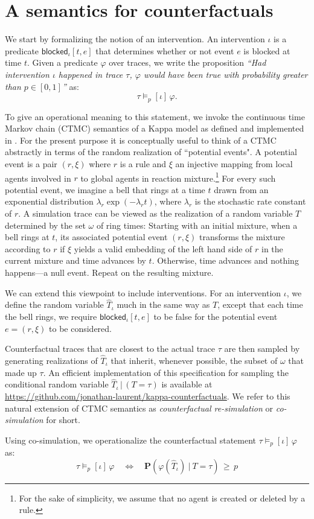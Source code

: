
\section{A semantics for counterfactuals}

We start by formalizing the notion of an intervention. An intervention $\iota$ is a predicate $\textsf{blocked}_{\iota}[t, e]$ that determines whether or not event $e$ is blocked at time $t$. Given a predicate $\varphi$ over traces, we write the proposition \textit{``Had intervention $\iota$ happened in trace $\tau$, $\varphi$ would have been true with probability greater than $p \in [0,1]$''} as:
\[ \tau \models_p [\iota] \, \varphi. \]

To give an operational meaning to this statement, we invoke the continuous time Markov chain (CTMC) semantics of a Kappa model as defined and implemented in \cite{DanosEtAl-APLAS07,BoutillierEK17}. For the present purpose it is conceptually useful to think of a CTMC abstractly in terms of the random realization of ``potential events". A potential event is a pair $(r, \xi)$ where $r$ is a rule and $\xi$ an injective mapping from local agents involved in $r$ to global agents in reaction mixture.\footnote{For the sake of simplicity, we assume that no agent is created or deleted by a rule.} For every such potential event, we imagine a bell that rings at a time $t$ drawn from an exponential distribution $\lambda_r\exp(-\lambda_r t)$, where $\lambda_r$ is the stochastic rate constant of $r$. A simulation trace can be viewed as the realization of a random variable $T$ determined by the set $\omega$ of ring times: Starting with an initial mixture, when a bell rings at $t$, its associated potential event $(r, \xi)$ transforms the mixture according to $r$ if $\xi$ yields a valid embedding of the left hand side of $r$ in the current mixture and time advances by $t$. Otherwise, time advances and nothing happens---a null event. Repeat on the resulting mixture.

We can extend this viewpoint to include interventions. For an intervention $\iota$, we define the random variable $\hat T_\iota$ much in the same way as $T$, except that each time the bell rings, we require $\textsf{blocked}_\iota[t, e]$ to be false for the potential event $e=(r, \xi)$ to be considered. 

Counterfactual traces that are closest to the actual trace $\tau$ are then sampled by generating realizations of $\hat T_\iota$ that inherit, whenever possible, the subset of $\omega$ that made up $\tau$. An efficient implementation of this specification for sampling the conditional random variable ${\hat T}_\iota \,|\, (T = \tau)$ is available at \url{https://github.com/jonathan-laurent/kappa-counterfactuals}. We refer to this natural extension of CTMC semantics as \textit{counterfactual re-simulation} or \textit{co-simulation} for short.

Using co-simulation, we operationalize the counterfactual statement $ \tau \models_p [\iota] \, \varphi $ as:
\[ \tau \models_p [\iota] \, \varphi \quad \Leftrightarrow 
\quad \mathbf{P}( \varphi(\hat T_\iota) \ |\  T = \tau) \,\geq\, p \]
